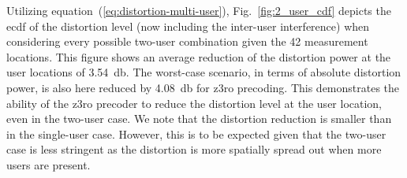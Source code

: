 \documentclass[conference]{IEEEtran}
\newcommand{\todo}[1]{{\color{red}[Todo: #1]}}
\newcommand{\gilles}[1]{{\color{orange}[Gilles: #1]}}
\newcommand{\update}[1]{{#1}}
\newcommand{\zero}[0]{\gls{z3ro}\xspace}
\newcommand{\zerop}[0]{\zero precoder\xspace}
\newcommand{\mrt}[0]{\gls{mrt}\xspace}
\begin{document}
\update{Utilizing equation~(\ref{eq:distortion-multi-user}), Fig.~\ref{fig:2_user_cdf} depicts the \gls{ecdf} of the distortion level (now including the inter-user interference) when considering every possible two-user combination given the 42 measurement locations. This figure shows an average reduction of the distortion power at the user locations of \SI{3.54}{\decibel}. The worst-case scenario, in terms of absolute distortion power, is also here reduced by \SI{4.08}{\decibel} for \zero precoding. This demonstrates the ability of the \zerop to reduce the distortion level at the user location, even in the two-user case. We note that the distortion reduction is smaller than in the single-user case. However, this is to be expected given that the two-user case is less stringent as the distortion is more spatially spread out when more users are present.} 













%   

%   
\end{document}
